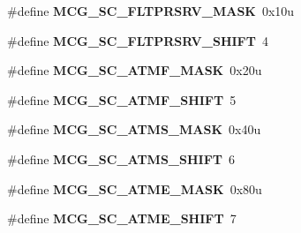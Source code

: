 \begin{DoxyCompactItemize}
\item 
\hypertarget{group___m_c_g___register___masks_ga1eea80f4646116c2ca2a68aa3469436a}{}\#define {\bfseries M\+C\+G\+\_\+\+S\+C\+\_\+\+F\+L\+T\+P\+R\+S\+R\+V\+\_\+\+M\+A\+S\+K}~0x10u\label{group___m_c_g___register___masks_ga1eea80f4646116c2ca2a68aa3469436a}

\item 
\hypertarget{group___m_c_g___register___masks_gac75a3cb915913ba4acc64a098bba4eb5}{}\#define {\bfseries M\+C\+G\+\_\+\+S\+C\+\_\+\+F\+L\+T\+P\+R\+S\+R\+V\+\_\+\+S\+H\+I\+F\+T}~4\label{group___m_c_g___register___masks_gac75a3cb915913ba4acc64a098bba4eb5}

\item 
\hypertarget{group___m_c_g___register___masks_ga15326687d7d214b4847a3cae6e6cdfaa}{}\#define {\bfseries M\+C\+G\+\_\+\+S\+C\+\_\+\+A\+T\+M\+F\+\_\+\+M\+A\+S\+K}~0x20u\label{group___m_c_g___register___masks_ga15326687d7d214b4847a3cae6e6cdfaa}

\item 
\hypertarget{group___m_c_g___register___masks_gac7fd1ff91fc1de6800a18f875398d966}{}\#define {\bfseries M\+C\+G\+\_\+\+S\+C\+\_\+\+A\+T\+M\+F\+\_\+\+S\+H\+I\+F\+T}~5\label{group___m_c_g___register___masks_gac7fd1ff91fc1de6800a18f875398d966}

\item 
\hypertarget{group___m_c_g___register___masks_gaf5a12b51cc62a0ce10f3fbecdebd0222}{}\#define {\bfseries M\+C\+G\+\_\+\+S\+C\+\_\+\+A\+T\+M\+S\+\_\+\+M\+A\+S\+K}~0x40u\label{group___m_c_g___register___masks_gaf5a12b51cc62a0ce10f3fbecdebd0222}

\item 
\hypertarget{group___m_c_g___register___masks_ga9a8ce406d5868276e9c3b37190ab89b1}{}\#define {\bfseries M\+C\+G\+\_\+\+S\+C\+\_\+\+A\+T\+M\+S\+\_\+\+S\+H\+I\+F\+T}~6\label{group___m_c_g___register___masks_ga9a8ce406d5868276e9c3b37190ab89b1}

\item 
\hypertarget{group___m_c_g___register___masks_gaf9545e815c86bd04d8513af024cb8617}{}\#define {\bfseries M\+C\+G\+\_\+\+S\+C\+\_\+\+A\+T\+M\+E\+\_\+\+M\+A\+S\+K}~0x80u\label{group___m_c_g___register___masks_gaf9545e815c86bd04d8513af024cb8617}

\item 
\hypertarget{group___m_c_g___register___masks_ga146594251d4266d02fecc44c1f0dd6ae}{}\#define {\bfseries M\+C\+G\+\_\+\+S\+C\+\_\+\+A\+T\+M\+E\+\_\+\+S\+H\+I\+F\+T}~7\label{group___m_c_g___register___masks_ga146594251d4266d02fecc44c1f0dd6ae}


\end{DoxyCompactItemize}

